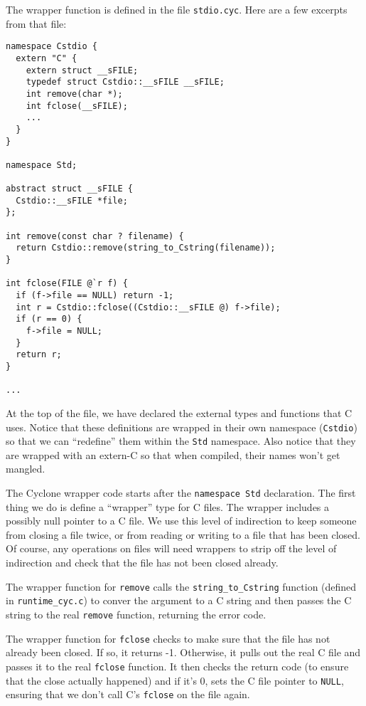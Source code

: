 The wrapper function is defined in the file \texttt{stdio.cyc}.
Here are a few excerpts from that file:
\begin{verbatim}
namespace Cstdio {
  extern "C" {
    extern struct __sFILE;
    typedef struct Cstdio::__sFILE __sFILE;
    int remove(char *);
    int fclose(__sFILE);
    ...
  }
}

namespace Std;

abstract struct __sFILE {
  Cstdio::__sFILE *file; 
};

int remove(const char ? filename) {
  return Cstdio::remove(string_to_Cstring(filename));
}

int fclose(FILE @`r f) {
  if (f->file == NULL) return -1;
  int r = Cstdio::fclose((Cstdio::__sFILE @) f->file);
  if (r == 0) {
    f->file = NULL;
  }
  return r;
}

...
\end{verbatim}
At the top of the file, we have declared the external types
and functions that C uses.  Notice that these definitions
are wrapped in their own namespace (\texttt{Cstdio}) so that
we can ``redefine'' them within the \texttt{Std} namespace.
Also notice that they are wrapped with an extern-C so that
when compiled, their names won't get mangled.

The Cyclone wrapper code starts after the \texttt{namespace Std}
declaration.  The first thing we do is define a ``wrapper''
type for C files.  The wrapper includes a possibly null pointer
to a C file.  We use this level of indirection to keep someone
from closing a file twice, or from reading or writing to a file
that has been closed.  Of course, any operations on files will
need wrappers to strip off the level of indirection and check
that the file has not been closed already.  

The wrapper function for \texttt{remove} calls the \texttt{string\_to\_Cstring}
function (defined in \texttt{runtime\_cyc.c}) to conver the
argument to a C string and then passes the C string to the
real \texttt{remove} function, returning the error code.

The wrapper function for \texttt{fclose} checks to make sure that
the file has not already been closed.  If so, it returns -1.
Otherwise, it pulls out the real C file and passes it to the
real \texttt{fclose} function.  It then checks the return code
(to ensure that the close actually happened) and if it's 0,
sets the C file pointer to \texttt{NULL}, ensuring that we
don't call C's \texttt{fclose} on the file again.  

